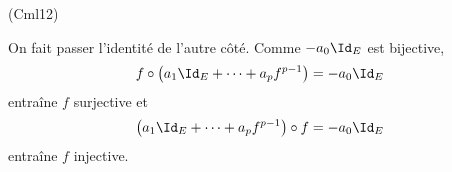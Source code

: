 \begin{tiny}(Cml12)\end{tiny} On fait passer l'identité de l'autre côté. Comme $-a_0\Id_E$ est bijective,
\begin{align*}
 f\circ\left( a_1\Id_E + \cdots + a_pf^{p-1}\right) = -a_0\Id_E 
\end{align*}
entraîne $f$ surjective et 
\begin{align*}
 \left( a_1\Id_E + \cdots + a_pf^{p-1}\right)\circ f = -a_0\Id_E 
\end{align*}
entraîne $f$ injective.